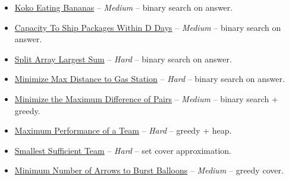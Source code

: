 \documentclass[11pt]{article}
\begin{document}
\begin{itemize}
  \item \href{https://leetcode.com/problems/koko-eating-bananas/}{Koko Eating Bananas} -- \emph{Medium} -- binary search on answer.
  \item \href{https://leetcode.com/problems/capacity-to-ship-packages-within-d-days/}{Capacity To Ship Packages Within D Days} -- \emph{Medium} -- binary search on answer.
  \item \href{https://leetcode.com/problems/split-array-largest-sum/}{Split Array Largest Sum} -- \emph{Hard} -- binary search on answer.
  \item \href{https://leetcode.com/problems/minimize-max-distance-to-gas-station/}{Minimize Max Distance to Gas Station} -- \emph{Hard} -- binary search on answer.
  \item \href{https://leetcode.com/problems/minimize-the-maximum-difference-of-pairs/}{Minimize the Maximum Difference of Pairs} -- \emph{Medium} -- binary search + greedy.
  \item \href{https://leetcode.com/problems/maximum-performance-of-a-team/}{Maximum Performance of a Team} -- \emph{Hard} -- greedy + heap.
  \item \href{https://leetcode.com/problems/smallest-sufficient-team/}{Smallest Sufficient Team} -- \emph{Hard} -- set cover approximation.
  \item \href{https://leetcode.com/problems/minimum-number-of-arrows-to-burst-balloons/}{Minimum Number of Arrows to Burst Balloons} -- \emph{Medium} -- greedy cover.
\end{itemize}
\end{document}
